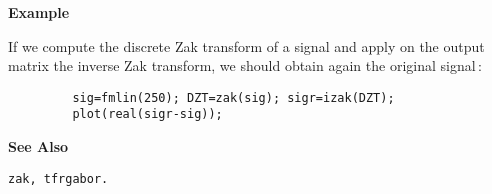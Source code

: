 {\bf \large {}\selectfont Example}\\
\hspace*{1.5cm}
\begin{minipage}[t]{13.5cm}
If we compute the discrete Zak transform of a signal and apply on the
output matrix the inverse Zak transform, we should obtain again the
original signal\,:
\begin{verbatim}
         sig=fmlin(250); DZT=zak(sig); sigr=izak(DZT);
         plot(real(sigr-sig));
\end{verbatim}
\end{minipage}
\vspace*{.5cm}


{\bf \large {}\selectfont See Also}\\
\hspace*{1.5cm}
\begin{minipage}[t]{13.5cm}
\begin{verbatim}
zak, tfrgabor.
\end{verbatim}
\end{minipage}

